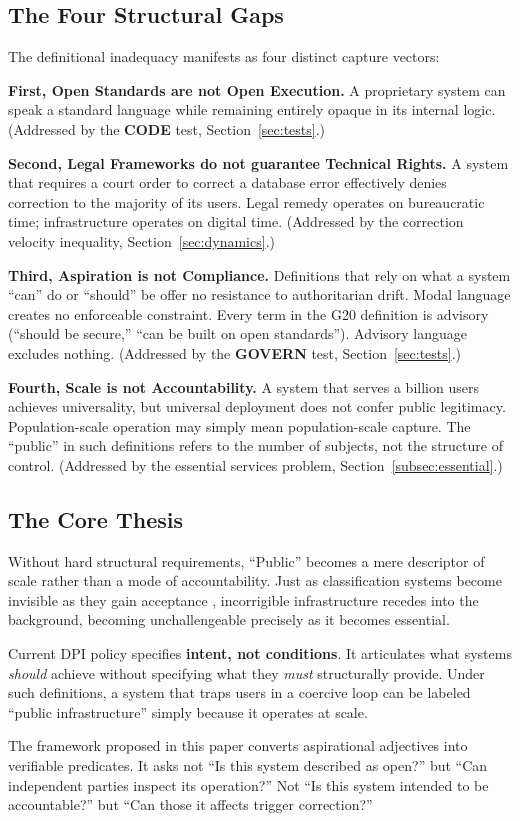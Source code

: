 \documentclass{article}
\begin{document}
\subsection{The Four Structural Gaps}

The definitional inadequacy manifests as four distinct capture vectors:

\textbf{First, Open Standards are not Open Execution.} A proprietary system can speak a standard language while remaining entirely opaque in its internal logic. (Addressed by the \textbf{CODE} test, Section~\ref{sec:tests}.)

\textbf{Second, Legal Frameworks do not guarantee Technical Rights.} A system that requires a court order to correct a database error effectively denies correction to the majority of its users. Legal remedy operates on bureaucratic time; infrastructure operates on digital time. (Addressed by the correction velocity inequality, Section~\ref{sec:dynamics}.)

\textbf{Third, Aspiration is not Compliance.} Definitions that rely on what a system ``can'' do or ``should'' be offer no resistance to authoritarian drift. Modal language creates no enforceable constraint. Every term in the G20 definition is advisory (``should be secure,'' ``can be built on open standards''). Advisory language excludes nothing. (Addressed by the \textbf{GOVERN} test, Section~\ref{sec:tests}.)

\textbf{Fourth, Scale is not Accountability.} A system that serves a billion users achieves universality, but universal deployment does not confer public legitimacy. Population-scale operation may simply mean population-scale capture. The ``public'' in such definitions refers to the number of subjects, not the structure of control. (Addressed by the essential services problem, Section~\ref{subsec:essential}.)

\subsection{The Core Thesis}

Without hard structural requirements, ``Public'' becomes a mere descriptor of scale rather than a mode of accountability. Just as classification systems become invisible as they gain acceptance \citep{bowker1999}, incorrigible infrastructure recedes into the background, becoming unchallengeable precisely as it becomes essential.

\begin{clarification}[title=The Definitional Problem]
Current DPI policy specifies \textbf{intent, not conditions}. It articulates what systems \textit{should} achieve without specifying what they \textit{must} structurally provide. Under such definitions, a system that traps users in a coercive loop can be labeled ``public infrastructure'' simply because it operates at scale.

The framework proposed in this paper converts aspirational adjectives into verifiable predicates. It asks not ``Is this system described as open?'' but ``Can independent parties inspect its operation?'' Not ``Is this system intended to be accountable?'' but ``Can those it affects trigger correction?''
\end{clarification}
\end{document}
